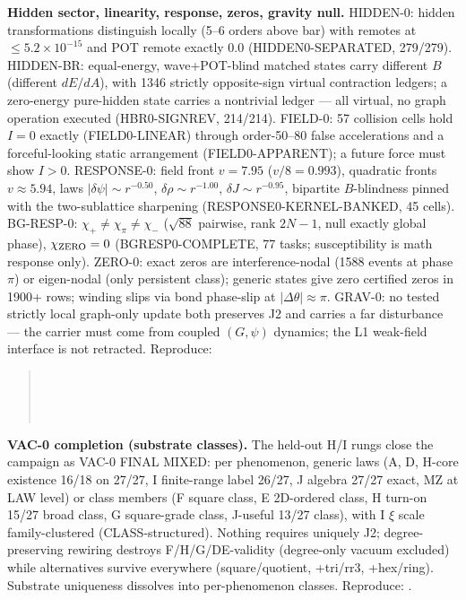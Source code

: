 \documentclass[11pt]{article}
\begin{document}
\textbf{Hidden sector, linearity, response, zeros, gravity null.}
HIDDEN-0: hidden transformations distinguish locally (5--6 orders above
bar) with remotes at $\le 5.2\times 10^{-15}$ and POT remote exactly 0.0
(HIDDEN0-SEPARATED, 279/279). HIDDEN-BR: equal-energy, wave+POT-blind
matched states carry different $B$ (different $dE/dA$), with 1346
strictly opposite-sign virtual contraction ledgers; a zero-energy
pure-hidden state carries a nontrivial ledger --- all virtual, no graph
operation executed (HBR0-SIGNREV, 214/214). FIELD-0: 57 collision cells
hold $I = 0$ exactly (FIELD0-LINEAR) through order-50--80 false
accelerations and a forceful-looking static arrangement
(FIELD0-APPARENT); a future force must show $I > 0$. RESPONSE-0: field
front $v = 7.95$ ($v/8 = 0.993$), quadratic fronts $v \approx 5.94$,
laws $|\delta\psi| \sim r^{-0.50}$, $\delta\rho \sim r^{-1.00}$,
$\delta J \sim r^{-0.95}$, bipartite $B$-blindness pinned with the
two-sublattice sharpening (RESPONSE0-KERNEL-BANKED, 45 cells).
BG-RESP-0: $\chi_+ \ne \chi_\pi \ne \chi_-$ ($\sqrt{88}$ pairwise, rank
$2N{-}1$, null exactly global phase), $\chi_{\rm ZERO} = 0$
(BGRESP0-COMPLETE, 77 tasks; susceptibility is math response only).
ZERO-0: exact zeros are interference-nodal (1588 events at phase $\pi$)
or eigen-nodal (only persistent class); generic states give zero
certified zeros in 1900+ rows; winding slips via bond phase-slip at
$|\Delta\theta| \approx \pi$. GRAV-0: no tested strictly local
graph-only update both preserves J2 and carries a far disturbance ---
the carrier must come from coupled $(G,\psi)$ dynamics; the L1
weak-field interface is not retracted.
Reproduce:
\begin{quote}\small
{}\\
\\
\\
\end{quote}

\textbf{VAC-0 completion (substrate classes).} The held-out H/I rungs
close the campaign as VAC-0 FINAL MIXED: per phenomenon, generic laws
(A, D, H-core existence 16/18 on 27/27, I finite-range label 26/27,
J algebra 27/27 exact, MZ at LAW level) or class members (F square class,
E 2D-ordered class, H turn-on 15/27 broad class, G square-grade class,
J-useful 13/27 class), with I $\xi$ scale family-clustered
(CLASS-structured). Nothing requires uniquely J2; degree-preserving
rewiring destroys F/H/G/DE-validity (degree-only vacuum excluded) while
alternatives survive everywhere (square/quotient, +tri/rr3, +hex/ring).
Substrate uniqueness dissolves into per-phenomenon classes.
Reproduce: .
\end{document}

